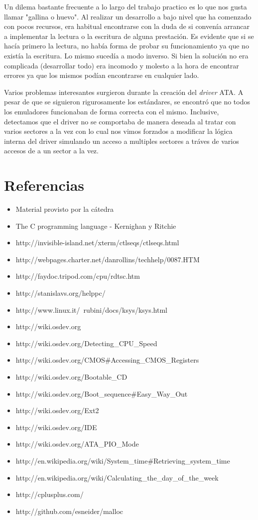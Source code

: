 \documentclass[a4paper,10pt]{article}
\begin{document}
Un dilema bastante frecuente a lo largo del trabajo practico es lo que nos gusta llamar "gallina o huevo". Al realizar
un desarrollo a bajo nivel que ha comenzado con pocos recursos, era habitual encontrarse con la duda de si convenía
arrancar a implementar la lectura o la escritura de alguna prestación. Es evidente que si se hacía primero la lectura, 
no había forma de probar su funcionamiento ya que no existía la escritura. Lo mismo sucedía a modo inverso. Si bien 
la solución no era complicada (desarrollar todo) era incomodo y molesto a la hora de encontrar errores ya que los mismos
podían encontrarse en cualquier lado.

Varios problemas interesantes surgieron durante la creación del \textit{driver} ATA. A pesar de que se siguieron
rigurosamente los estándares, se encontró que no todos los emuladores funcionaban de forma correcta con el mismo.
Inclusive, detectamos que el driver no se comportaba de manera deseada al tratar con varios sectores a la vez con lo
cual nos vimos forzados a modificar la lógica interna del driver simulando un acceso a multiples sectores a tráves de
varios accesos de a un sector a la vez.

\newpage     
\section{Referencias}

\begin{itemize}
  \item Material provisto por la cátedra
  \item The C programming language - Kernighan y Ritchie
  \item http://invisible-island.net/xterm/ctlseqs/ctlseqs.html
  \item http://webpages.charter.net/danrollins/techhelp/0087.HTM
  \item http://faydoc.tripod.com/cpu/rdtsc.htm
  \item http://stanislavs.org/helppc/
  \item http://www.linux.it/~rubini/docs/ksys/ksys.html
  \item http://wiki.osdev.org
  \item http://wiki.osdev.org/Detecting\_CPU\_Speed
  \item	http://wiki.osdev.org/CMOS\#Accessing\_CMOS\_Registers
  \item http://wiki.osdev.org/Bootable\_CD
  \item http://wiki.osdev.org/Boot\_sequence\#Easy\_Way\_Out
  \item http://wiki.osdev.org/Ext2
  \item http://wiki.osdev.org/IDE
  \item http://wiki.osdev.org/ATA\_PIO\_Mode
  \item http://en.wikipedia.org/wiki/System\_time\#Retrieving\_system\_time
  \item http://en.wikipedia.org/wiki/Calculating\_the\_day\_of\_the\_week
  \item http://cplusplus.com/
  \item http://github.com/esneider/malloc
\end{itemize}
   
\end{document}
